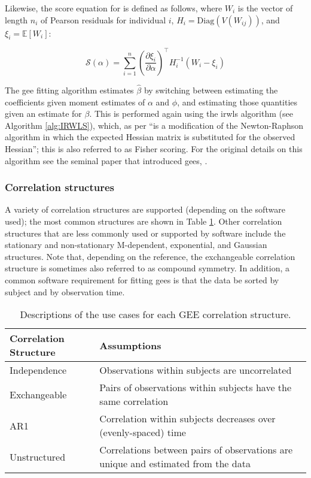 \documentclass{report}
\begin{document}
Likewise, the score equation for is defined as follows, where $W_i$ is the vector of length $n_i$ of Pearson residuals for individual $i$, $H_i = \text{Diag}\left(V(W_{ij})\right)$, and $\xi_i = \mathbb{E}[W_i]$:

\begin{equation}\label{eq:glm-gee-score-equation-alpha}
    \mathcal{S}(\alpha) = \sum_{i=1}^n \left(\frac{\partial\xi_i}{\partial\alpha}\right)^\intercal H_i^{-1} (W_i - \xi_i)
\end{equation}

The \gls{gee} fitting algorithm estimates $\hat{\beta}$ by switching between estimating the coefficients given moment estimates of $\alpha$ and $\phi$, and estimating those quantities given an estimate for $\beta$. This is performed again using the \gls{irwls} algorithm (see Algorithm \ref{alg:IRWLS}), which, as per \cite[Chapter~4]{hardin_generalized_2012} ``is a modification of the Newton-Raphson algorithm in which the expected Hessian matrix is substituted for the observed Hessian''; this is also referred to as Fisher scoring. For the original details on this algorithm see the seminal paper that introduced \glspl{gee}, \cite{liang_longitudinal_1986}. 

\subsubsection{Correlation structures}

A variety of correlation structures are supported (depending on the software used); the most common structures are shown in Table \ref{table:correlation-structures}. Other correlation structures that are less commonly used or supported by software include the stationary and non-stationary M-dependent, exponential, and Gaussian structures. Note that, depending on the reference, the exchangeable correlation structure is sometimes also referred to as compound symmetry. In addition, a common software requirement for fitting \glspl{gee} is that the data be sorted by subject and by observation time. 

\begin{table}[h!]
\centering
\begin{tabular}{||l l||} 
 \hline
 \textbf{Correlation Structure} & \textbf{Assumptions} \\ [0.5ex] 
  \hline\hline
  Independence & Observations within subjects are uncorrelated \\ 
  \hline
  Exchangeable & Pairs of observations within subjects have the same correlation \\
  \hline
  AR1 & Correlation within subjects decreases over (evenly-spaced) time \\
  \hline 
  Unstructured & Correlations between pairs of observations are unique and estimated from the data \\ 
  \hline
\end{tabular}
\caption{Descriptions of the use cases for each GEE correlation structure.}
\label{table:correlation-structures}
\end{table}
\end{document}
